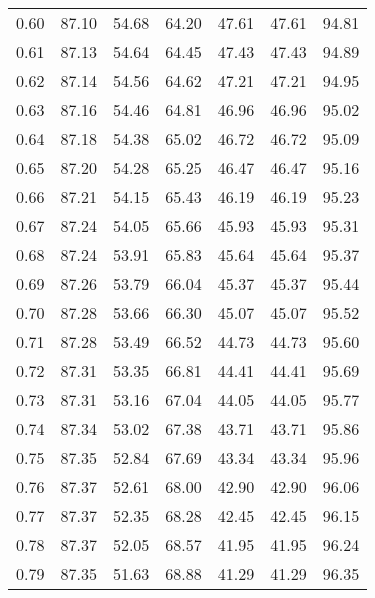 \begin{tabular}{|c|c|c|c|c|c|c|}
      0.60 &     87.10 &     54.68 &      64.20 &   47.61 &      47.61 &         94.81 \\
      0.61 &     87.13 &     54.64 &      64.45 &   47.43 &      47.43 &         94.89 \\
      0.62 &     87.14 &     54.56 &      64.62 &   47.21 &      47.21 &         94.95 \\
      0.63 &     87.16 &     54.46 &      64.81 &   46.96 &      46.96 &         95.02 \\
      0.64 &     87.18 &     54.38 &      65.02 &   46.72 &      46.72 &         95.09 \\
      0.65 &     87.20 &     54.28 &      65.25 &   46.47 &      46.47 &         95.16 \\
      0.66 &     87.21 &     54.15 &      65.43 &   46.19 &      46.19 &         95.23 \\
      0.67 &     87.24 &     54.05 &      65.66 &   45.93 &      45.93 &         95.31 \\
      0.68 &     87.24 &     53.91 &      65.83 &   45.64 &      45.64 &         95.37 \\
      0.69 &     87.26 &     53.79 &      66.04 &   45.37 &      45.37 &         95.44 \\
      0.70 &     87.28 &     53.66 &      66.30 &   45.07 &      45.07 &         95.52 \\
      0.71 &     87.28 &     53.49 &      66.52 &   44.73 &      44.73 &         95.60 \\
      0.72 &     87.31 &     53.35 &      66.81 &   44.41 &      44.41 &         95.69 \\
      0.73 &     87.31 &     53.16 &      67.04 &   44.05 &      44.05 &         95.77 \\
      0.74 &     87.34 &     53.02 &      67.38 &   43.71 &      43.71 &         95.86 \\
      0.75 &     87.35 &     52.84 &      67.69 &   43.34 &      43.34 &         95.96 \\
      0.76 &     87.37 &     52.61 &      68.00 &   42.90 &      42.90 &         96.06 \\
      0.77 &     87.37 &     52.35 &      68.28 &   42.45 &      42.45 &         96.15 \\
      0.78 &     87.37 &     52.05 &      68.57 &   41.95 &      41.95 &         96.24 \\
      0.79 &     87.35 &     51.63 &      68.88 &   41.29 &      41.29 &         96.35 \\

\end{tabular}
